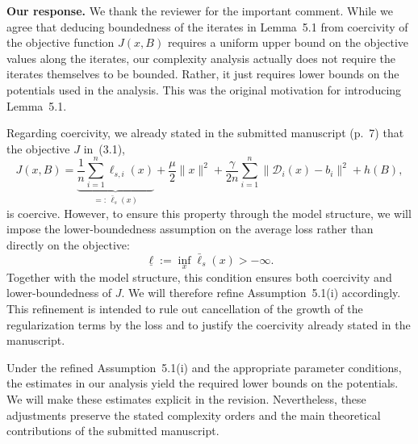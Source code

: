 \documentclass[11pt]{article}
\begin{document}
\vspace{0.5em}
\noindent\textbullet\quad\textbf{Our response.}
We thank the reviewer for the important comment. While we agree that deducing boundedness of the iterates in Lemma~5.1 from coercivity of the objective function $J(x, B)$ requires a uniform upper bound on the objective values along the iterates, our complexity analysis actually does not require the iterates themselves to be bounded. Rather, it just requires lower bounds on the potentials used in the analysis. This was the original motivation for introducing Lemma~5.1.

Regarding coercivity, we already stated in the submitted manuscript
(p.~7) that the objective $J$ in~(3.1),
\[
J(x,B)=
\underbrace{\frac1n\sum_{i=1}^n\ell_{s,i}(x)}_{=:\,\bar{\ell}_s(x)}
+\frac{\mu}{2}\|x\|^2
+\frac{\gamma}{2n}\sum_{i=1}^n\|\mathcal D_i(x)-b_i\|^2
+h(B),
\]
is coercive. However, to ensure this property through the model
structure, we will impose the lower-boundedness assumption on
the average loss rather than directly on the objective:
\[
\underline{\ell}:=\inf_x\bar{\ell}_s(x)>-\infty.
\]
Together with the model structure, this condition ensures both
coercivity and lower-boundedness of $J$. We will therefore refine
Assumption~5.1(i) accordingly. This refinement is intended to
rule out cancellation of the growth of the regularization terms
by the loss and to justify the coercivity already stated in
the manuscript.

Under the refined Assumption~5.1(i) and the
appropriate parameter conditions, the estimates in our analysis
yield the required lower bounds on the potentials. We will make
these estimates explicit in the revision. Nevertheless, these
adjustments preserve the stated complexity orders and the main
theoretical contributions of the submitted manuscript.

\end{document}
